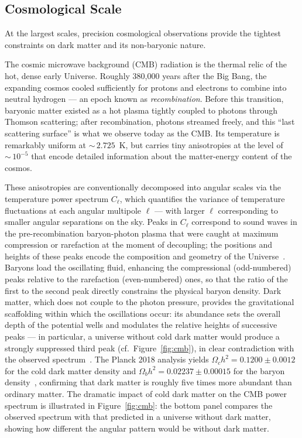 \subsection{Cosmological Scale}
\label{sec:1.1.3}

At the largest scales, precision cosmological observations provide the tightest constraints on dark matter and its non-baryonic nature.

The cosmic microwave background (CMB) radiation is the thermal relic of the hot, dense early Universe.
Roughly 380,000 years after the Big Bang, the expanding cosmos cooled sufficiently for protons and electrons to combine into neutral hydrogen --- an epoch known as \emph{recombination}.
Before this transition, baryonic matter existed as a hot plasma tightly coupled to photons through Thomson scattering; after recombination, photons streamed freely, and this ``last scattering surface'' is what we observe today as the CMB.
Its temperature is remarkably uniform at ${\sim}\,2.725$~K, but carries tiny anisotropies at the level of ${\sim}\,10^{-5}$ that encode detailed information about the matter-energy content of the cosmos.

These anisotropies are conventionally decomposed into angular scales via the temperature power spectrum $C_\ell$, which quantifies the variance of temperature fluctuations at each angular multipole $\ell$ --- with larger $\ell$ corresponding to smaller angular separations on the sky.
Peaks in $C_\ell$ correspond to sound waves in the pre-recombination baryon-photon plasma that were caught at maximum compression or rarefaction at the moment of decoupling; the positions and heights of these peaks encode the composition and geometry of the Universe~\cite{Aghanim:2018eyx,Cirelli:2024ssz}.
Baryons load the oscillating fluid, enhancing the compressional (odd-numbered) peaks relative to the rarefaction (even-numbered) ones, so that the ratio of the first to the second peak directly constrains the physical baryon density.
Dark matter, which does not couple to the photon pressure, provides the gravitational scaffolding within which the oscillations occur: its abundance sets the overall depth of the potential wells and modulates the relative heights of successive peaks --- in particular, a universe without cold dark matter would produce a strongly suppressed third peak (cf.\ Figure~\ref{fig:cmb}), in clear contradiction with the observed spectrum~\cite{Cirelli:2024ssz}.
The Planck 2018 analysis yields $\Omega_c h^2 = 0.1200 \pm 0.0012$ for the cold dark matter density and $\Omega_b h^2 = 0.02237 \pm 0.00015$ for the baryon density~\cite{Aghanim:2018eyx}, confirming that dark matter is roughly five times more abundant than ordinary matter.
The dramatic impact of cold dark matter on the CMB power spectrum is illustrated in Figure~\ref{fig:cmb}: the bottom panel compares the observed spectrum with that predicted in a universe without dark matter, showing how different the angular pattern would be without dark matter.

